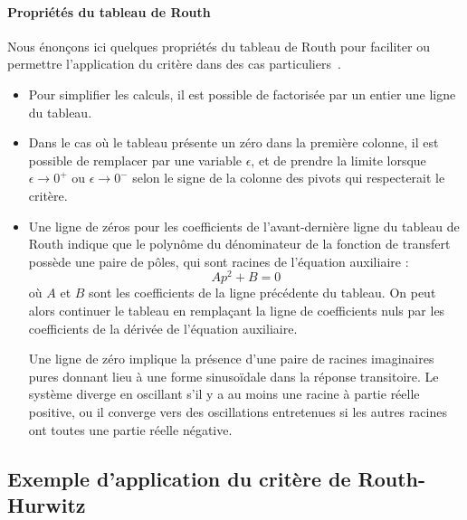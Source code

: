\paragraph{Propriétés du tableau de Routh}
Nous énonçons ici quelques propriétés du tableau de Routh 
pour faciliter ou permettre l'application du critère dans 
des cas particuliers~\cite{Ostertag}. 
\begin{itemize}
    \item Pour simplifier les calculs, il est possible de factorisée par un 
          entier une ligne du tableau.
    \item Dans le cas où le tableau présente un zéro dans la première 
          colonne, il est possible de remplacer par une variable $\epsilon$, 
          et de prendre la limite lorsque $\epsilon\rightarrow 0^+$ ou 
          $\epsilon\rightarrow 0^-$ selon le signe de la colonne des pivots
          qui respecterait le critère.
    \item Une ligne de zéros pour les coefficients de l'avant-dernière ligne 
          du tableau de Routh indique que le polynôme du dénominateur de la 
          fonction de transfert possède une paire de pôles, qui sont racines de 
          l'équation auxiliaire :
    \[
        Ap^2+B=0
    \]
    où $A$ et $B$ sont les coefficients de la ligne précédente du tableau. 
    On peut alors continuer le tableau en remplaçant la ligne de coefficients 
    nuls par les coefficients de la dérivée de l'équation auxiliaire. 
    
    Une ligne de zéro implique la présence d'une paire de racines imaginaires 
    pures donnant lieu à une forme sinuso\"idale dans la réponse transitoire.
    Le système diverge en oscillant s'il y a au moins une racine à partie 
    réelle positive, ou il converge vers des oscillations entretenues si les 
    autres racines ont toutes une partie réelle négative.
\end{itemize}
\subsection{Exemple d'application du critère de Routh-Hurwitz}


